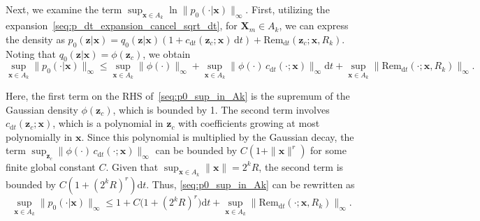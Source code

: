 Next, we examine the term $\sup_{\bm x\in A_k}\ln\|p_0(\cdot|\bm x)\|_\infty$. First, utilizing the expansion~\eqref{seq:p_dt_expansion_cancel_sqrt_dt}, for $\bm X_m\in A_k$, we can express the density as $p_0(\bm z|\bm x)=q_0(\bm z|\bm x)(1+c_{\mathrm dt}(\bm z_c;\bm x)\,\mathrm dt)+\mathrm{Rem}_{\mathrm dt}(\bm z_c;\bm x,R_k)$. Noting that $q_0(\bm z|\bm x)=\phi(\bm z_c)$, we obtain
\begin{equation}
    \sup_{\bm x\in A_k}
    \|p_0(\cdot|\bm x)\|_\infty
    \leq
    \sup_{\bm x\in A_k}
    \|\phi(\cdot)\|_\infty
    +\sup_{\bm x\in A_k}
    \|\phi(\cdot)\,c_{\mathrm dt}(\cdot;\bm x)\|_\infty\mathrm dt
    +\sup_{\bm x\in A_k}
    \|\mathrm{Rem}_{\mathrm dt}(\cdot;\bm x,R_k)\|_\infty.
    \label{seq:p0_sup_in_Ak}
\end{equation}

Here, the first term on the RHS of~\eqref{seq:p0_sup_in_Ak} is the supremum of the Gaussian density $\phi(\bm z_c)$, which is bounded by 1. The second term involves $c_{\mathrm dt}(\bm z_c;\bm x)$, which is a polynomial in $\bm z_c$ with coefficients growing at most polynomially in $\bm x$. Since this polynomial is multiplied by the Gaussian decay, the term $\sup_{\bm z_c}\|\phi(\cdot)\,c_{\mathrm dt}(\cdot;\bm x)\|_\infty$ can be bounded by $C(1+\|\bm x\|^r)$ for some finite global constant $C$. Given that $\sup_{\bm x\in A_k}\!\|\bm x\|=2^k R$, the second term is bounded by $C(1+(2^kR)^r)\mathrm dt$. Thus, \eqref{seq:p0_sup_in_Ak} can be rewritten as
\begin{equation}
    \sup_{\bm x\in A_k}
    \|p_0(\cdot|\bm x)\|_\infty
    \leq
    1
    +C\big(1+(2^kR)^r\big)\mathrm dt
    +\sup_{\bm x\in A_k}
    \|\mathrm{Rem}_{\mathrm dt}(\cdot;\bm x,R_k)\|_\infty.
    \label{seq:p0_sup_in_Ak_second}
\end{equation}


